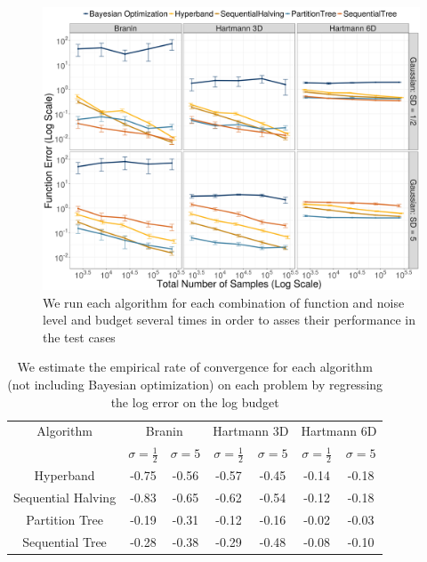 \documentclass[11pt]{article}
\begin{document}
\begin{figure}
  \includegraphics[width=\textwidth]{emp_results.png}
    \caption{We run each algorithm for each combination of function and noise level and budget several times in order to asses their performance in the test cases}
    \label{fig:emp_results}
\end{figure}

\begin{table}[ht]
\centering
\begin{tabular}{c c c c c c c}
  \hline
Algorithm & \multicolumn{2}{c}{Branin} & \multicolumn{2}{c}{Hartmann 3D} & \multicolumn{2}{c}{Hartmann 6D}\\
& $\sigma=\frac{1}{2}$ & $\sigma = 5$ & $\sigma=\frac{1}{2}$ &  $\sigma = 5$ &  $\sigma=\frac{1}{2}$ &  $\sigma = 5$\\
  \hline
Hyperband & -0.75 & -0.56 & -0.57 & -0.45 & -0.14 & -0.18 \\ 
Sequential Halving & -0.83 & -0.65 & -0.62 & -0.54 & -0.12 & -0.18 \\ 
Partition Tree & -0.19 & -0.31 & -0.12 & -0.16 & -0.02 & -0.03 \\ 
Sequential Tree & -0.28 & -0.38 & -0.29 & -0.48 & -0.08 & -0.10 \\ 
   \hline
\end{tabular}
\label{emp_rates}
\caption{We estimate the empirical rate of convergence for each algorithm (not including Bayesian optimization) on each problem by regressing the log error on the log budget}
\label{table:rates}
\end{table}
\end{document}
